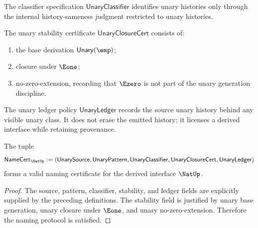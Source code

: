\begin{definition}
\label{def:unary-classifier-specification}
The classifier specification \(\mathsf{UnaryClassifier}\) identifies unary histories only through the internal history-sameness judgment restricted to unary histories.
\end{definition}

\begin{definition}
\label{def:unary-stability-certificate}
The unary stability certificate \(\mathsf{UnaryClosureCert}\) consists of:
\begin{enumerate}
  \item the base derivation \(\mathsf{Unary}(\emp)\);
  \item closure under \(\Eone\);
  \item no-zero-extension, recording that \(\Ezero\) is not part of the unary generation discipline.
\end{enumerate}
\end{definition}

\begin{definition}
\label{def:unary-ledger-policy}
The unary ledger policy \(\mathsf{UnaryLedger}\) records the source unary history behind any visible unary class. It does not erase the emitted history; it licenses a derived interface while retaining provenance.
\end{definition}

\begin{theorem}
\label{thm:concrete-natup-namecert}
The tuple
$$
  \mathsf{NameCert}_{\NatUp}
  :=
  (\mathsf{UnarySource},
   \mathsf{UnaryPattern},
   \mathsf{UnaryClassifier},
   \mathsf{UnaryClosureCert},
   \mathsf{UnaryLedger})
$$
forms a valid naming certificate for the derived interface \(\NatUp\).
\end{theorem}
\begin{proof}
The source, pattern, classifier, stability, and ledger fields are explicitly supplied by the preceding definitions. The stability field is justified by unary base generation, unary closure under \(\Eone\), and unary no-zero-extension. Therefore the naming protocol is satisfied.
\end{proof}

